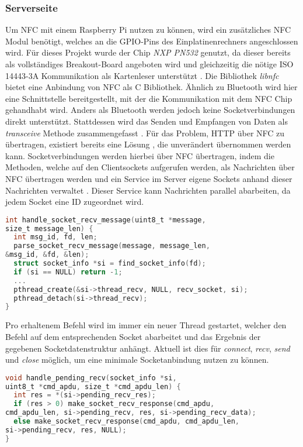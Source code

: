     \subsubsection{Serverseite}
	    Um NFC mit einem Raspberry Pi nutzen zu können, wird ein zusätzliches NFC Modul benötigt, welches an die GPIO-Pins des Einplatinenrechners angeschlossen wird. Für dieses Projekt wurde der Chip {\it NXP PN532} genutzt, da dieser bereits als vollständiges Breakout-Board angeboten wird und gleichzeitig die nötige ISO 14443-3A Kommunikation als Kartenleser unterstützt \cite{nxpChip}.
	    Die Bibliothek {\it libnfc} bietet eine Anbindung von NFC als C Bibliothek. Ähnlich zu Bluetooth wird hier eine Schnittstelle bereitgestellt, mit der die Kommunikation mit dem NFC Chip gehandhabt wird. Anders als Bluetooth werden jedoch keine Socketverbindungen direkt unterstützt. Stattdessen wird das Senden und Empfangen von Daten als {\it transceive} Methode zusammengefasst \cite{libnfc}.
	    Für das Problem, HTTP über NFC zu übertragen, existiert bereits eine Lösung \cite{nfcSocketsBlog}, die unverändert übernommen werden kann. Socketverbindungen werden hierbei über NFC übertragen, indem die Methoden, welche auf den Clientsockets aufgerufen werden, als Nachrichten über NFC übertragen werden und ein Service im Server eigene Sockets anhand dieser Nachrichten verwaltet \cite{nfcSocketsBlog}. Dieser Service kann Nachrichten parallel abarbeiten, da jedem Socket eine ID zugeordnet wird. 
	    \begin{lstlisting}[frame=bt, label={lst:nfc:recv}, language=C, caption=Datenempfang über NFC (Servercode in C) \cite{nfcSocketsServer}]
int handle_socket_recv_message(uint8_t *message,
size_t message_len) {
  int msg_id, fd, len;
  parse_socket_recv_message(message, message_len,
&msg_id, &fd, &len);
  struct socket_info *si = find_socket_info(fd);
  if (si == NULL) return -1;
  ...
  pthread_create(&si->thread_recv, NULL, recv_socket, si);
  pthread_detach(si->thread_recv);
}
        \end{lstlisting}
	    Pro erhaltenem Befehl wird im  immer ein neuer Thread gestartet, welcher den Befehl auf dem entsprechenden Socket abarbeitet und das Ergebnis der gegebenen Socketdatenstruktur anhängt. Aktuell ist dies für {\it connect}, {\it recv}, {\it send} und {\it close} möglich, um eine minimale Socketanbindung nutzen zu können.
	    \begin{lstlisting}[frame=bt, label={lst:nfc:recvPending}, language=C, caption=Senden von Daten über NFC (Servercode in C) \cite{nfcSocketsServer}]
void handle_pending_recv(socket_info *si,
uint8_t *cmd_apdu, size_t *cmd_apdu_len) {
  int res = *(si->pending_recv_res);
  if (res > 0) make_socket_recv_response(cmd_apdu,
cmd_apdu_len, si->pending_recv, res, si->pending_recv_data);
  else make_socket_recv_response(cmd_apdu, cmd_apdu_len,
si->pending_recv, res, NULL);
}
        \end{lstlisting}
